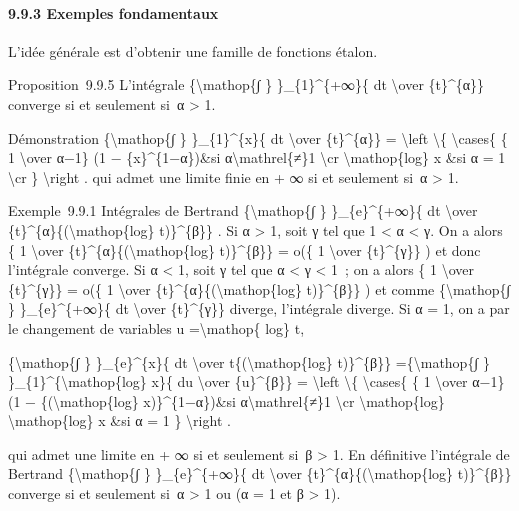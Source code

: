 \documentclass[]{article}
\begin{document}
\paragraph{9.9.3 Exemples fondamentaux}

L'idée générale est d'obtenir une famille de fonctions étalon.

Proposition~9.9.5 L'intégrale \{\textbackslash{}mathop\{∫ \}
\}\_\{1\}\^{}\{+∞\}\{ dt \textbackslash{}over \{t\}\^{}\{α\}\} converge
si et seulement si~α \textgreater{} 1.

Démonstration \{\textbackslash{}mathop\{∫ \} \}\_\{1\}\^{}\{x\}\{ dt
\textbackslash{}over \{t\}\^{}\{α\}\} = \textbackslash{}left
\textbackslash{}\{ \textbackslash{}cases\{ \{ 1 \textbackslash{}over
α−1\} (1 − \{x\}\^{}\{1−α\})\&si α\textbackslash{}mathrel\{≠\}1
\textbackslash{}cr \textbackslash{}mathop\{log\} x \&si α = 1
\textbackslash{}cr \} \textbackslash{}right . qui admet une limite finie
en + ∞ si et seulement si~α \textgreater{} 1.

Exemple~9.9.1 Intégrales de Bertrand \{\textbackslash{}mathop\{∫ \}
\}\_\{e\}\^{}\{+∞\}\{ dt \textbackslash{}over
\{t\}\^{}\{α\}\{(\textbackslash{}mathop\{log\} t)\}\^{}\{β\}\} . Si α
\textgreater{} 1, soit γ tel que 1 \textless{} α \textless{} γ. On a
alors \{ 1 \textbackslash{}over
\{t\}\^{}\{α\}\{(\textbackslash{}mathop\{log\} t)\}\^{}\{β\}\} = o(\{ 1
\textbackslash{}over \{t\}\^{}\{γ\}\} ) et donc l'intégrale converge. Si
α \textless{} 1, soit γ tel que α \textless{} γ \textless{} 1~; on a
alors \{ 1 \textbackslash{}over \{t\}\^{}\{γ\}\} = o(\{ 1
\textbackslash{}over \{t\}\^{}\{α\}\{(\textbackslash{}mathop\{log\}
t)\}\^{}\{β\}\} ) et comme \{\textbackslash{}mathop\{∫ \}
\}\_\{e\}\^{}\{+∞\}\{ dt \textbackslash{}over \{t\}\^{}\{γ\}\} diverge,
l'intégrale diverge. Si α = 1, on a par le changement de variables u
=\textbackslash{}mathop\{ log\} t,

\{\textbackslash{}mathop\{∫ \} \}\_\{e\}\^{}\{x\}\{ dt
\textbackslash{}over t\{(\textbackslash{}mathop\{log\} t)\}\^{}\{β\}\}
=\{\textbackslash{}mathop\{∫ \}
\}\_\{1\}\^{}\{\textbackslash{}mathop\{log\} x\}\{ du
\textbackslash{}over \{u\}\^{}\{β\}\} = \textbackslash{}left
\textbackslash{}\{ \textbackslash{}cases\{ \{ 1 \textbackslash{}over
α−1\} (1 − \{(\textbackslash{}mathop\{log\} x)\}\^{}\{1−α\})\&si
α\textbackslash{}mathrel\{≠\}1 \textbackslash{}cr
\textbackslash{}mathop\{log\} \textbackslash{}mathop\{log\} x \&si α = 1
\} \textbackslash{}right .

qui admet une limite en + ∞ si et seulement si~β \textgreater{} 1. En
définitive l'intégrale de Bertrand \{\textbackslash{}mathop\{∫ \}
\}\_\{e\}\^{}\{+∞\}\{ dt \textbackslash{}over
\{t\}\^{}\{α\}\{(\textbackslash{}mathop\{log\} t)\}\^{}\{β\}\} converge
si et seulement si~α \textgreater{} 1 ou (α = 1 et β \textgreater{} 1).
\end{document}
